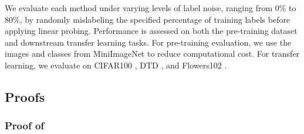 We evaluate each method under varying levels of label noise, ranging from $0\%$ to $80\%$, by randomly mislabeling the specified percentage of training labels before applying linear probing. Performance is assessed on both the pre-training dataset and downstream transfer learning tasks. For pre-training evaluation, we use the images and classes from MiniImageNet \citep{vinyals2016matching} to reduce computational cost. For transfer learning, we evaluate on CIFAR100 \citep{krizhevsky2009learning}, DTD \citep{cimpoi14describing}, and Flowers102 \citep{nilsback2008automated}.


\subsection{Proofs}\label{app:proofs}

\subsubsection{Proof of }\label{app:proof_prop}

